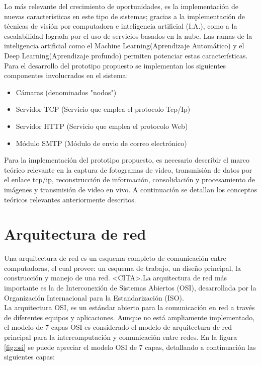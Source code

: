 Lo más relevante del crecimiento de oportunidades, es la implementación de nuevas características en este tipo de sistemas; gracias a la implementación de técnicas de visión por computadora e inteligencia artificial (I.A.), como a la escalabilidad lograda por el uso de servicios basados en la nube. Las ramas de la inteligencia artificial como el Machine Learning(Aprendizaje Automático) y el Deep Learning(Aprendizaje profundo) permiten potenciar estas características.\\

Para el desarrollo del prototipo propuesto se implementan los siguientes componentes involucrados en el sistema:
\begin{itemize}
    \item Cámaras (denominados "nodos")
    \item Servidor TCP (Servicio que emplea el protocolo Tcp/Ip)
    \item Servidor HTTP (Servicio que emplea el protocolo Web)
    \item Módulo SMTP (Módulo de envio de correo electrónico)
\end{itemize}

Para la implementación del prototipo propuesto, es necesario describir el marco teórico relevante en la captura de fotogramas de video, transmisión de datos por el enlace tcp/ip, reconstrucción de información, consolidación y procesamiento de imágenes y transmisión de video en vivo. A continuación se detallan los conceptos teóricos relevantes anteriormente descritos.\\

\section{Arquitectura de red}
Una arquitectura de red es un esquema completo de comunicación entre computadoras, el cual provee: un esquema de trabajo, un diseño principal, la construcción y manejo de una red. <CITA>.La arquitectura de red más importante es la de Interconexión de Sistemas Abiertos (OSI), desarrollada por la Organización Internacional para la Estandarización (ISO).\\

La arquitectura OSI, es un estándar abierto para la comunicación en red a través de diferentes equipos y aplicaciones. Aunque no está ampliamente implementado, el modelo de 7 capas OSI es considerado el modelo de arquitectura de red principal para la intercomputación y comunicación entre redes. En la figura \ref{fig:osi} se puede apreciar el modelo OSI de 7 capas, detallando a continuación las siguientes capas:

